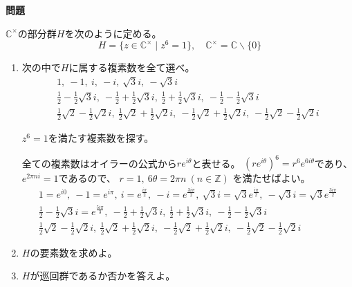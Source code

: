\documentclass[12pt,b5paper]{ltjsarticle}
\begin{document}
\hrulefill
\textbf{問題}
\hrulefill



$\mathbb{C}^{\times}$の部分群$H$を次のように定める。
\begin{equation}
 H=\{z\in\mathbb{C}^{\times} \mid z^{6}=1\}
  ,\quad
  \mathbb{C}^{\times}=\mathbb{C}\backslash \{0\}
\end{equation}
\begin{enumerate}
 \item
      次の中で$H$に属する複素数を全て選べ。
      \begin{gather}
        1,\ -1,\
        i,\ -i,\
        \sqrt{3}i,\ -\sqrt{3}i\\
        \frac{1}{2}-\frac{1}{2}\sqrt{3}i,\
        -\frac{1}{2}+\frac{1}{2}\sqrt{3}i,\
        \frac{1}{2}+\frac{1}{2}\sqrt{3}i,\
        -\frac{1}{2}-\frac{1}{2}\sqrt{3}i\\
        \frac{1}{2}\sqrt{2}-\frac{1}{2}\sqrt{2}i,\
        \frac{1}{2}\sqrt{2}+\frac{1}{2}\sqrt{2}i,\
        -\frac{1}{2}\sqrt{2}+\frac{1}{2}\sqrt{2}i,\
        -\frac{1}{2}\sqrt{2}-\frac{1}{2}\sqrt{2}i
      \end{gather}
\dotfill

      $z^6=1$を満たす複素数を探す。
      
      全ての複素数はオイラーの公式から$re^{i\theta}$と表せる。
      $(re^{i\theta})^6=r^{6}e^{6i\theta}$であり、
      $e^{2\pi n i}=1$であるので、
      $r= 1,\ 6\theta = 2\pi n \ (n\in\mathbb{Z})$
      を満たせばよい。
      \begin{gather}
        1=e^{i0},\ -1=e^{i\pi},\
        i=e^{\frac{i\pi}{2}},\ -i=e^{\frac{3i\pi}{2}},\
        \sqrt{3}i=\sqrt{3}e^{\frac{i\pi}{2}},\ -\sqrt{3}i=\sqrt{3}e^{\frac{3i\pi}{2}}\\
        \frac{1}{2}-\frac{1}{2}\sqrt{3}i=e^{\frac{5i\pi}{3}},\
        -\frac{1}{2}+\frac{1}{2}\sqrt{3}i,\
        \frac{1}{2}+\frac{1}{2}\sqrt{3}i,\
        -\frac{1}{2}-\frac{1}{2}\sqrt{3}i\\
        \frac{1}{2}\sqrt{2}-\frac{1}{2}\sqrt{2}i,\
        \frac{1}{2}\sqrt{2}+\frac{1}{2}\sqrt{2}i,\
        -\frac{1}{2}\sqrt{2}+\frac{1}{2}\sqrt{2}i,\
        -\frac{1}{2}\sqrt{2}-\frac{1}{2}\sqrt{2}i
      \end{gather}


\hrulefill
 \item
      $H$の要素数を求めよ。

 \item
      $H$が巡回群であるか否かを答えよ。
\end{enumerate}
\end{document}
